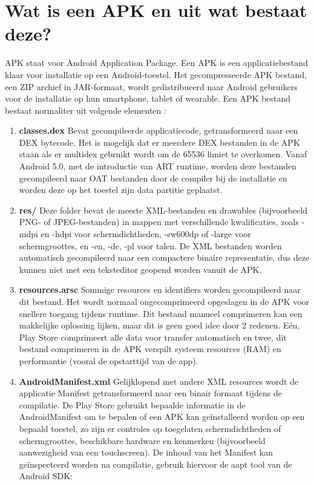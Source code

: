 \section{Wat is een APK en uit wat bestaat deze?}
APK staat voor Android Application Package. Een APK is een applicatiebestand klaar voor installatie op een Android-toestel. Het gecompresseerde APK bestand, een ZIP archief in JAR-formaat, wordt gedistribueerd naar Android gebruikers voor de installatie op hun smartphone, tablet of wearable. \autocite{PCMag}
Een APK bestand bestaat normaliter uit volgende elementen : 
\begin{enumerate}
	\setlength\itemsep{2em}
\item \textbf{classes.dex} \newline
Bevat gecompileerde applicatiecode, getransformeerd naar een DEX bytecode. Het is mogelijk dat er meerdere DEX bestanden in de APK staan als er multidex gebruikt wordt om de 65536 limiet te overkomen. Vanaf Android 5.0, met de introductie van ART runtime, worden deze bestanden gecompileerd naar OAT bestanden door de compiler bij de installatie en worden deze op het toestel zijn data partitie geplaatst. 
\item \textbf{res/} \newline
Deze folder bevat de meeste XML-bestanden en drawables (bijvoorbeeld PNG- of JPEG-bestanden) in mappen met verschillende kwalificaties, zoals -mdpi en -hdpi voor schermdichtheden, -sw600dp of -large voor schermgroottes, en -en, -de, -pl voor talen. De XML bestanden worden automatisch gecompileerd naar een compactere binaire representatie, dus deze kunnen niet met een teksteditor geopend worden vanuit de APK. 
\item \textbf{resources.arsc}\newline
Sommige resources en identifiers worden gecompileerd naar dit bestand. Het wordt normaal ongecomprimeerd opgeslagen in de APK voor snellere toegang tijdens runtime. Dit bestand manueel comprimeren kan een makkelijke oplossing lijken, maar dit is geen goed idee door 2 redenen. Eén, Play Store comprimeert alle data voor transfer automatisch en twee, dit bestand comprimeren in de APK verspilt systeem resources (RAM) en performantie (vooral de opstarttijd van de app).
\item \textbf{AndroidManifest.xml}\newline
Gelijklopend met andere XML resources wordt de applicatie Manifest getransformeerd naar een binair formaat tijdens de compilatie. De Play Store gebruikt bepaalde informatie in de AndroidManifest om te bepalen of een APK kan geïnstalleerd worden op een bepaald toestel, zo zijn er controles op toegelaten schermdichtheden of schermgroottes, beschikbare hardware en kenmerken (bijvoorbeeld aanwezigheid van een touchscreen). De inhoud van het Manifest kan geïnspecteerd worden na compilatie, gebruik hiervoor de aapt tool van de Android SDK: 

\end{enumerate}
